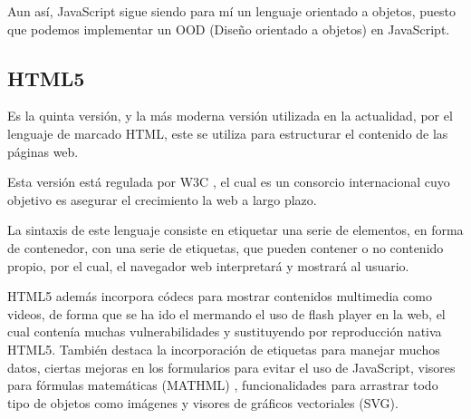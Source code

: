 Aun así, JavaScript sigue siendo para mí un lenguaje orientado a objetos, puesto que podemos implementar un OOD (Diseño orientado a objetos) en JavaScript.

\subsection{HTML5}

Es la quinta versión, y la más moderna versión utilizada en la actualidad, por el lenguaje de marcado HTML, este se utiliza para estructurar el contenido de las páginas web. \cite{HTML5}

Esta versión está regulada por W3C \cite{W3C}, el cual es un consorcio internacional cuyo objetivo es asegurar el crecimiento la web a largo plazo.

La sintaxis de este lenguaje consiste en etiquetar una serie de elementos, en forma de contenedor, con una serie de etiquetas, que pueden contener o no contenido propio, por el cual, el navegador web interpretará y mostrará al usuario.\cite{HTML}

HTML5 además incorpora códecs para mostrar contenidos multimedia como videos, de forma que se ha ido el mermando el uso de flash player en la web, el cual contenía muchas vulnerabilidades y sustituyendo por reproducción nativa HTML5.
También destaca la incorporación de etiquetas para manejar muchos datos, ciertas mejoras en los formularios para evitar el uso de JavaScript, visores  para fórmulas matemáticas (MATHML) , funcionalidades para arrastrar todo tipo de objetos como imágenes y visores de gráficos vectoriales (SVG).
